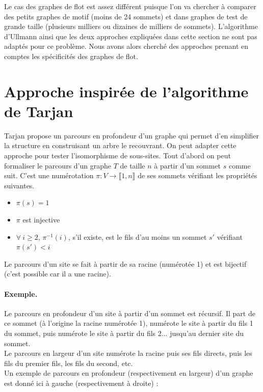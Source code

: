 Le cas des graphes de flot est assez différent puisque l'on va chercher à comparer des petits graphes de motif (moins de 24 sommets) et dans graphes de test de grande taille (plusieurs milliers ou dizaines de milliers de sommets).
L'algorithme d'Ullmann ainsi que les deux approches expliquées dans cette section ne sont pas adaptés pour ce problème. Nous avons alors cherché des approches prenant en comptes les spécificités des graphes de flot.

\section{Approche inspirée de l'algorithme de Tarjan}
Tarjan \cite{Tar71} propose un parcours en profondeur d'un graphe qui permet d'en simplifier la structure en construisant un arbre le recouvrant. 
On peut adapter cette approche pour tester l'isomorphisme de sous-sites. 
Tout d'abord on peut formaliser le parcours d'un graphe $T$ de taille $n$ à partir d'un sommet $s$ comme suit.
C'est une numérotation $\pi:V\rightarrow \llbracket 1, n \rrbracket$ de ses sommets vérifiant les propriétés suivantes.
\begin{itemize}
 \item $\pi(s)=1$
 \item $\pi$ est injective
 \item $\forall\ i\geq 2$, $\pi^{-1}(i)$, s'il existe, est le fils d'au moins un sommet $s'$ vérifiant $\pi(s')<i$
\end{itemize}

Le parcours d'un site se fait à partir de sa racine (numérotée 1) et est bijectif (c'est possible car il a une racine).

\paragraph{Exemple.}
Le parcours en profondeur d'un site à partir d'un sommet est récursif. Il part de ce sommet (à l'origine la racine numérotée 1), numérote le site à partir du fils 1 du sommet, puis numérote le site à partir du fils 2... jusqu'au dernier site du sommet.
\\
Le parcours en largeur d'un site numérote la racine puis ses fils directs, puis les fils du premier fils, les fils du second, etc.
\\
Un exemple de parcours en profondeur (respectivement en largeur) d'un graphe est donné ici à gauche (respectivement à droite) :%

